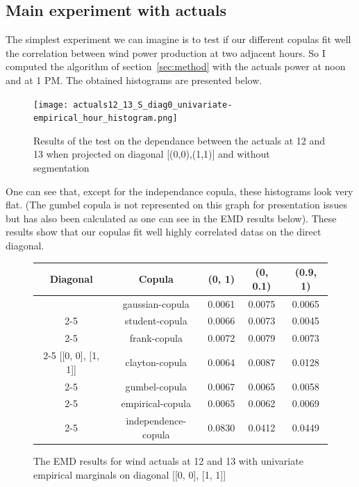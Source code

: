 \documentclass{article}
\begin{document}
\subsection{Main experiment with actuals}

The simplest experiment we can imagine is to test if our different copulas fit well the correlation between wind power production at two adjacent hours. So I computed the algorithm of section~\ref{sec:method} with the actuals power at noon and at 1 PM. The obtained histograms are presented below.

\begin{figure}[H]
  
    \texttt{[image: actuals12\_13\_S\_diag0\_univariate-empirical\_hour\_histogram.png]}
    \centering
    \caption{Results of the test on the dependance between the actuals at 12 and 13 when projected on diagonal [(0,0),(1,1)] and without segmentation}
\end{figure}

One can see that, except for the independance copula, these histograms look very flat. (The gumbel copula is not represented on this graph for presentation issues but has also been calculated as one can see in the EMD results below). These results show that our copulas fit well highly correlated datas on the direct diagonal.


\begin{figure}[h]
\centering
\begin{tabular}{|c|c|c|c|c|}
\hline
Diagonal & Copula & (0, 1) & (0, 0.1) & (0.9, 1) \\ \hline
  
& gaussian-copula & 0.0061 & 0.0075 & 0.0065 \\ \cline{2-5} 
& student-copula & 0.0066 & 0.0073 & 0.0045 \\ \cline{2-5} 
& frank-copula & 0.0072 & 0.0079 & 0.0073 \\ \cline{2-5} 
[[0, 0], [1, 1]] & clayton-copula & 0.0064 & 0.0087 & 0.0128 \\ \cline{2-5} 
& gumbel-copula & 0.0067 & 0.0065 & 0.0058 \\ \cline{2-5}
& empirical-copula & 0.0065 & 0.0062 & 0.0069 \\ \cline{2-5} 
& independence-copula & 0.0830 & 0.0412 & 0.0449 \\ \hline 
\end{tabular}
\caption{The EMD results for wind actuals at 12 and 13 with univariate empirical marginals on diagonal [[0, 0], [1, 1]]}
\end{figure} 
\end{document}
